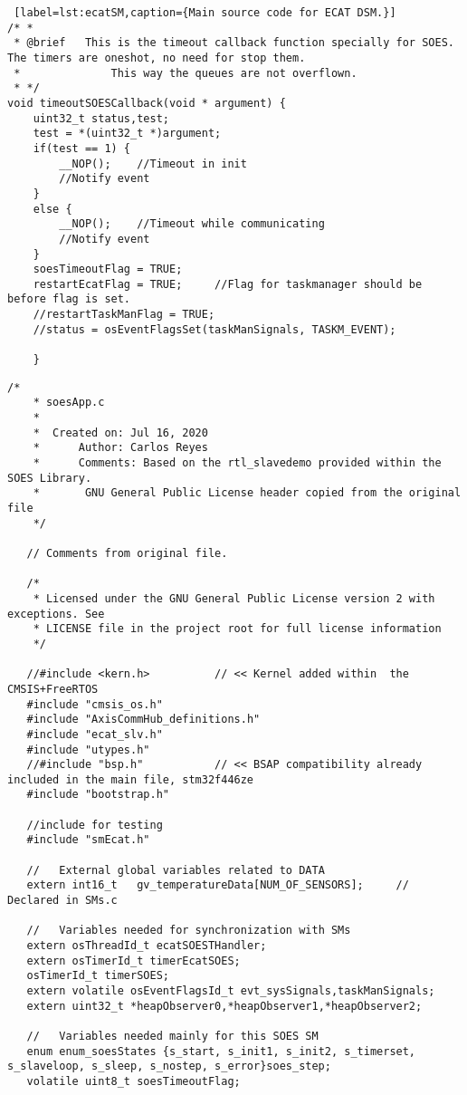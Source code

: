 \begin{lstlisting} [label=lst:ecatSM,caption={Main source code for ECAT DSM.}]
/* *
 * @brief	This is the timeout callback function specially for SOES. The timers are oneshot, no need for stop them.
 * 				This way the queues are not overflown.
 * */
void timeoutSOESCallback(void * argument) {
	uint32_t status,test;
	test = *(uint32_t *)argument;
	if(test == 1) {
		__NOP();	//Timeout in init
		//Notify event
	}
	else {
		__NOP();	//Timeout while communicating
		//Notify event
	}
	soesTimeoutFlag = TRUE;
	restartEcatFlag = TRUE;		//Flag for taskmanager should be before flag is set.
	//restartTaskManFlag = TRUE;
	//status = osEventFlagsSet(taskManSignals, TASKM_EVENT);

	}

\end{lstlisting}

\begin{lstlisting}[label=lst:soesAPP,caption={Main source code for SOES APP DSM.}]
    /*
    * soesApp.c
    *
    *  Created on: Jul 16, 2020
    *      Author: Carlos Reyes
    *      Comments: Based on the rtl_slavedemo provided within the SOES Library.
    *      	GNU General Public License header copied from the original file
    */
   
   // Comments from original file.
   
   /*
    * Licensed under the GNU General Public License version 2 with exceptions. See
    * LICENSE file in the project root for full license information
    */
   
   //#include <kern.h>			// << Kernel added within  the CMSIS+FreeRTOS
   #include "cmsis_os.h"
   #include "AxisCommHub_definitions.h"
   #include "ecat_slv.h"
   #include "utypes.h"
   //#include "bsp.h"			// << BSAP compatibility already included in the main file, stm32f446ze
   #include "bootstrap.h"
   
   //include for testing
   #include "smEcat.h"
   
   //	External global variables related to DATA
   extern int16_t	gv_temperatureData[NUM_OF_SENSORS];		//	Declared in SMs.c
   
   //	Variables needed for synchronization with SMs
   extern osThreadId_t ecatSOESTHandler;
   extern osTimerId_t timerEcatSOES;
   osTimerId_t timerSOES;
   extern volatile osEventFlagsId_t evt_sysSignals,taskManSignals;
   extern uint32_t *heapObserver0,*heapObserver1,*heapObserver2;
   
   //	Variables needed mainly for this SOES SM
   enum enum_soesStates {s_start, s_init1, s_init2, s_timerset, s_slaveloop, s_sleep, s_nostep, s_error}soes_step;
   volatile uint8_t soesTimeoutFlag;
   

\end{lstlisting}
